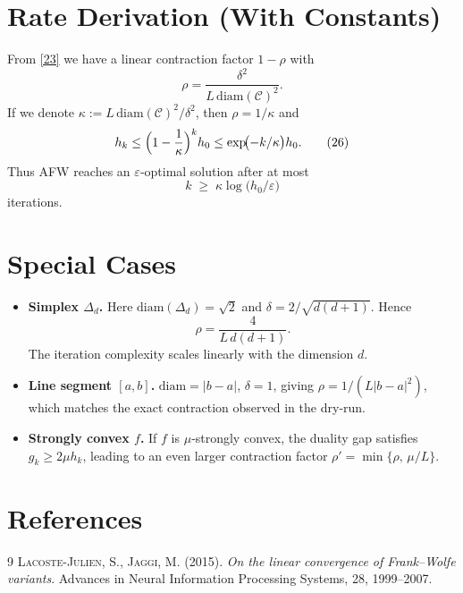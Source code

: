 \documentclass{article}
\newcommand{\C}{\mathcal{C}}
\newcommand{\diam}{\mathrm{diam}}
\begin{document}
\section*{Rate Derivation (With Constants)}
From \eqref{23} we have a linear contraction factor $1-\rho$ with
\[
\rho=\frac{\delta^{2}}{L\,\diam(\C)^{2}}.
\]
If we denote $\kappa:=L\,\diam(\C)^{2}/\delta^{2}$, then $\rho=1/\kappa$ and
\[
h_k\le\Bigl(1-\frac{1}{\kappa}\Bigr)^{k}h_0
\le\exp\!\bigl(-k/\kappa\bigr)h_0 .
\tag{26}
\]
Thus AFW reaches an $\varepsilon$‑optimal solution after at most
\[
k\;\ge\;\kappa\log\!\bigl(h_0/\varepsilon\bigr)
\]
iterations.

\section*{Special Cases}
\begin{itemize}
\item \textbf{Simplex $\Delta_d$.} Here $\diam(\Delta_d)=\sqrt{2}$ and $\delta=2/\sqrt{d(d+1)}$. Hence
\[
\rho=\frac{4}{L\,d(d+1)} .
\]
The iteration complexity scales linearly with the dimension $d$.
\item \textbf{Line segment $[a,b]$.} $\diam=|b-a|$, $\delta=1$, giving $\rho=1/(L|b-a|^{2})$, which matches the exact contraction observed in the dry‑run.
\item \textbf{Strongly convex $f$.} If $f$ is $\mu$‑strongly convex, the duality gap satisfies $g_k\ge 2\mu h_k$, leading to an even larger contraction factor $\rho'=\min\{\rho,\,\mu/L\}$.
\end{itemize}

\section*{References}
\begin{thebibliography}{9}
\textsc{Lacoste-Julien, S.}, \textsc{Jaggi, M.} (2015). \emph{On the linear convergence of Frank–Wolfe variants}. 
Advances in Neural Information Processing Systems, 28, 1999–2007.
\end{thebibliography}
\end{document}
